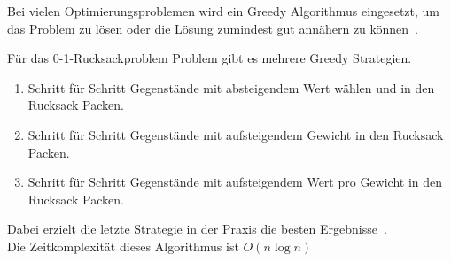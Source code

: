\documentclass[12pt, a4paper, ngerman]{article}
\begin{document}

Bei vielen Optimierungsproblemen wird ein Greedy Algorithmus eingesetzt,
um das Problem zu lösen oder die Lösung zumindest gut annähern zu können~\cite{paper102}.

Für das 0-1-Rucksackproblem Problem gibt es mehrere Greedy Strategien.

\begin{enumerate}
  \item Schritt für Schritt Gegenstände mit absteigendem Wert wählen und in den Rucksack Packen.
  \item Schritt für Schritt Gegenstände mit aufsteigendem Gewicht in den Rucksack Packen.
  \item Schritt für Schritt Gegenstände mit aufsteigendem Wert pro Gewicht in den Rucksack Packen.
\end{enumerate}

Dabei erzielt die letzte Strategie in der Praxis die besten Ergebnisse~\cite{paper102}.\\
Die Zeitkomplexität dieses Algorithmus ist \(O(n\log n)\)

\newpage
\printbibliography
\end{document}
